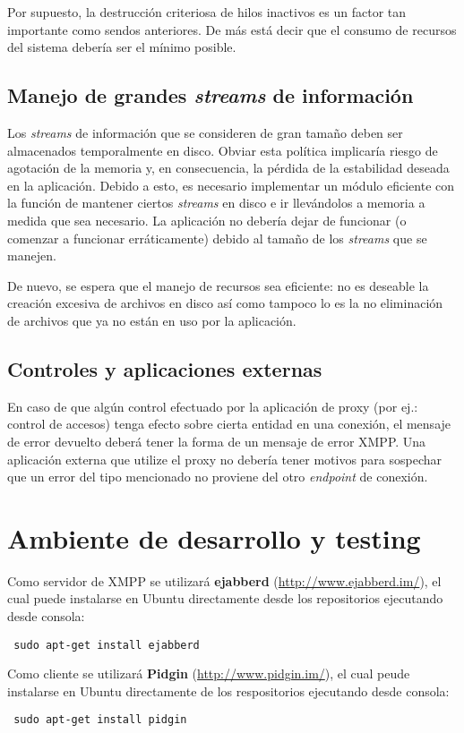 \documentclass[a4paper,10pt]{article}
\begin{document}
Por supuesto, la destrucción criteriosa de hilos inactivos es un factor tan importante como sendos anteriores. De más está decir que el consumo de recursos del sistema debería
ser el mínimo posible.

\subsection{Manejo de grandes \textit{streams} de información}
Los \textit{streams} de información que se consideren de gran tamaño deben ser almacenados temporalmente en disco. Obviar esta política implicaría riesgo de agotación de la memoria y, en consecuencia,
la pérdida de la estabilidad deseada en la aplicación. Debido a esto, es necesario implementar un módulo eficiente con la función de mantener ciertos \textit{streams}
en disco e ir llevándolos a memoria a medida que sea necesario. La aplicación no debería dejar de funcionar (o comenzar a funcionar erráticamente) debido al tamaño de los
\textit{streams} que se manejen.

De nuevo, se espera que el manejo de recursos sea eficiente: no es deseable la creación excesiva de archivos en disco así como tampoco lo es la no eliminación de archivos que ya no están en uso
por la aplicación.

\subsection{Controles y aplicaciones externas}
En caso de que algún control efectuado por la aplicación de proxy (por ej.: control de accesos) tenga efecto sobre cierta entidad en una conexión, el mensaje de error devuelto deberá tener
la forma de un mensaje de error XMPP. Una aplicación externa que utilize el proxy no debería tener motivos para sospechar que un error del tipo mencionado no proviene del otro
\textit{endpoint} de conexión.


\section{Ambiente de desarrollo y testing}
Como servidor de XMPP se utilizará \textbf{ejabberd} (\url{http://www.ejabberd.im/}), el cual puede instalarse en Ubuntu directamente desde los repositorios 
ejecutando desde consola:
\begin{verbatim}
 sudo apt-get install ejabberd
\end{verbatim}
Como cliente se utilizará \textbf{Pidgin} (\url{http://www.pidgin.im/}), el cual peude instalarse en Ubuntu directamente de los respositorios ejecutando 
desde consola:
\begin{verbatim}
 sudo apt-get install pidgin
\end{verbatim}
\end{document}
